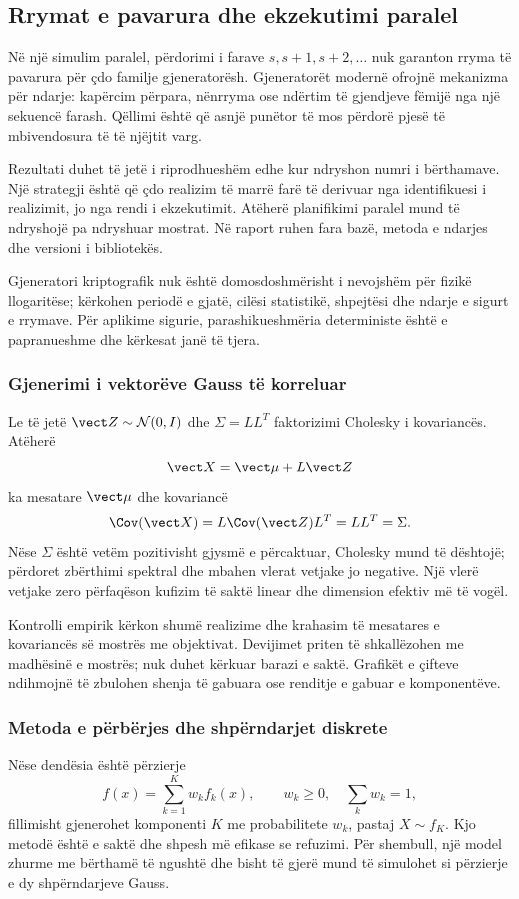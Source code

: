 \subsection{Rrymat e pavarura dhe ekzekutimi paralel}
Në një simulim paralel, përdorimi i farave $s,s+1,s+2,\ldots$ nuk garanton rryma të pavarura për çdo familje gjeneratorësh. Gjeneratorët modernë ofrojnë mekanizma për ndarje: kapërcim përpara, nënrryma ose ndërtim të gjendjeve fëmijë nga një sekuencë farash. Qëllimi është që asnjë punëtor të mos përdorë pjesë të mbivendosura të të njëjtit varg.

Rezultati duhet të jetë i riprodhueshëm edhe kur ndryshon numri i bërthamave. Një strategji është që çdo realizim të marrë farë të derivuar nga identifikuesi i realizimit, jo nga rendi i ekzekutimit. Atëherë planifikimi paralel mund të ndryshojë pa ndryshuar mostrat. Në raport ruhen fara bazë, metoda e ndarjes dhe versioni i bibliotekës.

Gjeneratori kriptografik nuk është domosdoshmërisht i nevojshëm për fizikë llogaritëse; kërkohen periodë e gjatë, cilësi statistikë, shpejtësi dhe ndarje e sigurt e rrymave. Për aplikime sigurie, parashikueshmëria deterministe është e papranueshme dhe kërkesat janë të tjera.

\subsubsection{Gjenerimi i vektorëve Gauss të korreluar}
Le të jetë $\vect Z\sim\mathcal N(0,I)$ dhe $\Sigma=LL^T$ faktorizimi Cholesky i kovariancës. Atëherë
\begin{equation}
 \vect X=\vect\mu+L\vect Z
\end{equation}
ka mesatare $\vect\mu$ dhe kovariancë
\begin{equation}
 \Cov(\vect X)=L\Cov(\vect Z)L^T=LL^T=\Sigma.
\end{equation}
Nëse $\Sigma$ është vetëm pozitivisht gjysmë e përcaktuar, Cholesky mund të dështojë; përdoret zbërthimi spektral dhe mbahen vlerat vetjake jo negative. Një vlerë vetjake zero përfaqëson kufizim të saktë linear dhe dimension efektiv më të vogël.

Kontrolli empirik kërkon shumë realizime dhe krahasim të mesatares e kovariancës së mostrës me objektivat. Devijimet priten të shkallëzohen me madhësinë e mostrës; nuk duhet kërkuar barazi e saktë. Grafikët e çifteve ndihmojnë të zbulohen shenja të gabuara ose renditje e gabuar e komponentëve.

\subsubsection{Metoda e përbërjes dhe shpërndarjet diskrete}
Nëse dendësia është përzierje
\begin{equation}
 f(x)=\sum_{k=1}^{K}w_kf_k(x),\qquad w_k\ge0,\quad\sum_kw_k=1,
\end{equation}
fillimisht gjenerohet komponenti $K$ me probabilitete $w_k$, pastaj $X\sim f_K$. Kjo metodë është e saktë dhe shpesh më efikase se refuzimi. Për shembull, një model zhurme me bërthamë të ngushtë dhe bisht të gjerë mund të simulohet si përzierje e dy shpërndarjeve Gauss.

